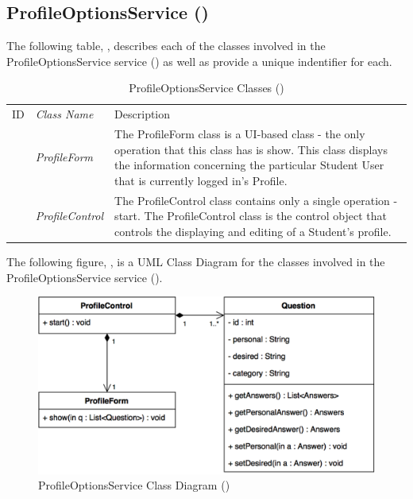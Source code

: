 \documentclass[12pt,letterpaper]{article}
\begin{document}
\subsection{ProfileOptionsService ()}

The following table, , describes each of the classes involved in the ProfileOptionsService service () as well as provide a unique indentifier for each.

\begin{table}[H]
	\caption{ProfileOptionsService Classes ()} 
	\begin{tabu} to 
	    \tableheader{}ID & Class Name & Description \\
		 & ProfileForm & The ProfileForm class is a UI-based class - the only operation that this class has is show. This class displays the information concerning the particular Student User that is currently logged in's Profile.\\
		 & ProfileControl & The ProfileControl class contains only a single operation - start. The ProfileControl class is the control object that controls the displaying and editing of a Student's profile. \\
	\end{tabu}
\end{table}

The following figure, , is a UML Class Diagram for the classes involved in the ProfileOptionsService service ().

\begin{figure}[H]
	\centering{}
	\includegraphics[scale=0.33]{imgs/d3/interfaces/profile-options.png}
	\caption{ProfileOptionsService Class Diagram ()}
\end{figure}
\end{document}
